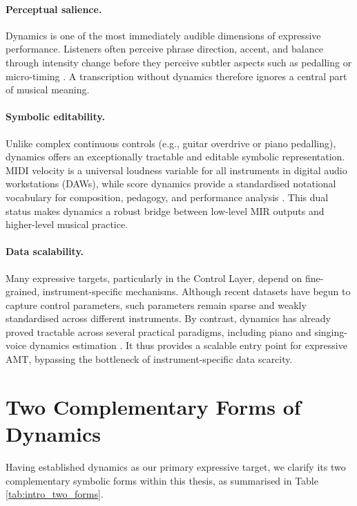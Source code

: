 \paragraph{Perceptual salience.}
Dynamics is one of the most immediately audible dimensions of expressive performance. Listeners often perceive phrase direction, accent, and balance through intensity change before they perceive subtler aspects such as pedalling or micro-timing \cite{goebl2003role,cancinoChacon2018computational}. A transcription without dynamics therefore ignores a central part of musical meaning.

\paragraph{Symbolic editability.}
Unlike complex continuous controls (e.g., guitar overdrive or piano pedalling), dynamics offers an exceptionally tractable and editable symbolic representation. MIDI velocity is a universal loudness variable for all instruments in digital audio workstations (DAWs), while score dynamics provide a standardised notational vocabulary for composition, pedagogy, and performance analysis \cite{kosta2014dynpiano,cancinoChacon2018computational}. This dual status makes dynamics a robust bridge between low-level MIR outputs and higher-level musical practice.

\paragraph{Data scalability.}
Many expressive targets, particularly in the Control Layer, depend on fine-grained, instrument-specific mechanisms. Although recent datasets have begun to capture control parameters, such parameters remain sparse and weakly standardised \cite{ryu2024midfild,lee2025gigamidi,tamer2023violin,loth2025goat,xie2025finegrained} across different instruments. By contrast, dynamics has already proved tractable across several practical paradigms, including piano and singing-voice dynamics estimation \cite{kim2024method,narang2024automatic}. It thus provides a scalable entry point for expressive AMT, bypassing the bottleneck of instrument-specific data scarcity.

\section{Two Complementary Forms of Dynamics}
\label{sec:intro:two_forms}
Having established dynamics as our primary expressive target, we clarify its two complementary symbolic forms within this thesis, as summarised in Table \ref{tab:intro_two_forms}.

